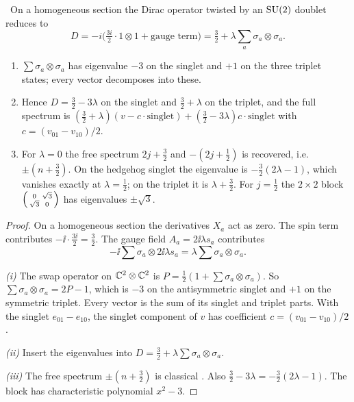 \begin{theorem}\label{thm:s3dirac}\ver\
On a homogeneous section the Dirac operator twisted by an $\mathrm{SU}(2)$ doublet reduces to
\[
D=-i\bigl(\tfrac{3i}2\cdot1\otimes1+\text{gauge term}\bigr)=\tfrac32+\lambda\textstyle\sum_a\sigma_a\otimes\sigma_a .
\]
\begin{enumerate}[label=(\roman*)]
\item $\sum\sigma_a\otimes\sigma_a$ has eigenvalue $-3$ on the singlet and $+1$ on the three triplet states; every vector decomposes into these.
\item Hence $D=\frac32-3\lambda$ on the singlet and $\frac32+\lambda$ on the triplet, and the full spectrum is $(\frac32+\lambda)(v-c\cdot\text{singlet})+(\frac32-3\lambda)c\cdot\text{singlet}$ with $c=(v_{01}-v_{10})/2$.
\item For $\lambda=0$ the free spectrum $2j+\frac32$ and $-(2j+\frac12)$ is recovered, i.e.\ $\pm(n+\frac32)$. On the hedgehog singlet the eigenvalue is $-\frac32(2\lambda-1)$, which vanishes exactly at $\lambda=\frac12$; on the triplet it is $\lambda+\frac32$. For $j=\frac12$ the $2\times2$ block $\begin{psmallmatrix}0&\sqrt3\\\sqrt3&0\end{psmallmatrix}$ has eigenvalues $\pm\sqrt3$.
\end{enumerate}
\end{theorem}
\begin{proof}
On a homogeneous section the derivatives $X_a$ act as zero. The spin term contributes $-\ii\cdot\frac{3\ii}2=\frac32$. The gauge field $A_a=2\ii\lambda s_a$ contributes
\[
-\ii\sum\sigma_a\otimes2\ii\lambda s_a=\lambda\sum\sigma_a\otimes\sigma_a .
\]

\emph{(i)} The swap operator on $\mathbb{C}^2\otimes\mathbb{C}^2$ is $P=\frac12(1+\sum\sigma_a\otimes\sigma_a)$. So $\sum\sigma_a\otimes\sigma_a=2P-1$, which is $-3$ on the antisymmetric singlet and $+1$ on the symmetric triplet. Every vector is the sum of its singlet and triplet parts. With the singlet $e_{01}-e_{10}$, the singlet component of $v$ has coefficient $c=(v_{01}-v_{10})/2$.

\emph{(ii)} Insert the eigenvalues into $D=\frac32+\lambda\sum\sigma_a\otimes\sigma_a$.

\emph{(iii)} The free spectrum $\pm(n+\frac32)$ is classical \ext. Also $\frac32-3\lambda=-\frac32(2\lambda-1)$. The block has characteristic polynomial $x^2-3$.
\end{proof}


